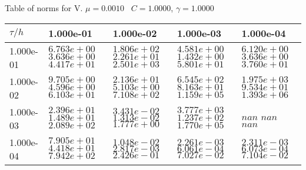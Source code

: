 \begin{center}
Table of norms for V. $\mu = 0.0010$ \, $C = 1.0000$, $\gamma = 1.0000$
  
\begin{tabular}{|p{1in}|p{1in}|p{1in}|p{1in}|p{1in}|} \hline
$\tau / h$ &1.000e-01 &1.000e-02 &1.000e-03 &1.000e-04 \\ \hline 
1.000e-01 & $6.763e+00$  $3.636e+00$  $4.417e+01$  & $1.806e+02$  $2.261e+01$  $2.501e+03$  & $4.581e+00$  $1.432e+00$  $5.801e+01$  & $6.120e+00$  $3.636e+00$  $3.760e+01$  \\ \hline 
1.000e-02 & $9.705e+00$  $4.596e+00$  $6.103e+01$  & $2.136e+01$  $5.103e+00$  $7.108e+02$  & $6.545e+02$  $8.163e+01$  $1.159e+05$  & $1.975e+03$  $9.534e+01$  $1.393e+06$  \\ \hline 
1.000e-03 & $2.396e+01$  $1.489e+01$  $2.089e+02$  & $3.431e-02$  $1.313e-02$  $1.777e+00$  & $3.777e+03$  $1.237e+02$  $1.770e+05$  & $nan$  $nan$  $nan$  \\ \hline 
1.000e-04 & $7.905e+01$  $4.418e+01$  $7.942e+02$  & $1.048e-02$  $2.817e-03$  $2.426e-01$  & $2.261e-03$  $6.061e-04$  $7.027e-02$  & $2.311e-03$  $6.073e-04$  $7.104e-02$  \\ \hline 

\end{tabular}\\[20pt]
\end{center}
